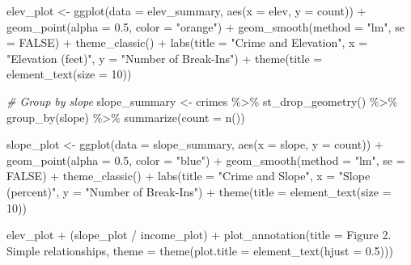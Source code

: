\documentclass[
]{article}
\newenvironment{Shaded}{\begin{snugshade}}{\end{snugshade}}
\newcommand{\AttributeTok}[1]{\textcolor[rgb]{0.77,0.63,0.00}{#1}}
\newcommand{\CommentTok}[1]{\textcolor[rgb]{0.56,0.35,0.01}{\textit{#1}}}
\newcommand{\ConstantTok}[1]{\textcolor[rgb]{0.00,0.00,0.00}{#1}}
\newcommand{\DecValTok}[1]{\textcolor[rgb]{0.00,0.00,0.81}{#1}}
\newcommand{\FloatTok}[1]{\textcolor[rgb]{0.00,0.00,0.81}{#1}}
\newcommand{\FunctionTok}[1]{\textcolor[rgb]{0.00,0.00,0.00}{#1}}
\newcommand{\NormalTok}[1]{#1}
\newcommand{\OtherTok}[1]{\textcolor[rgb]{0.56,0.35,0.01}{#1}}
\newcommand{\SpecialCharTok}[1]{\textcolor[rgb]{0.00,0.00,0.00}{#1}}
\newcommand{\StringTok}[1]{\textcolor[rgb]{0.31,0.60,0.02}{#1}}
\begin{document}
\begin{Shaded}
\begin{Highlighting}[]
\NormalTok{elev\_plot }\OtherTok{\textless{}{-}} \FunctionTok{ggplot}\NormalTok{(}\AttributeTok{data =}\NormalTok{ elev\_summary, }\FunctionTok{aes}\NormalTok{(}\AttributeTok{x =}\NormalTok{ elev, }\AttributeTok{y =}\NormalTok{ count)) }\SpecialCharTok{+}
  \FunctionTok{geom\_point}\NormalTok{(}\AttributeTok{alpha =} \FloatTok{0.5}\NormalTok{, }\AttributeTok{color =} \StringTok{"orange"}\NormalTok{) }\SpecialCharTok{+}
  \FunctionTok{geom\_smooth}\NormalTok{(}\AttributeTok{method =} \StringTok{"lm"}\NormalTok{, }\AttributeTok{se =} \ConstantTok{FALSE}\NormalTok{) }\SpecialCharTok{+}
  \FunctionTok{theme\_classic}\NormalTok{() }\SpecialCharTok{+}
  \FunctionTok{labs}\NormalTok{(}\AttributeTok{title =} \StringTok{"Crime and Elevation"}\NormalTok{,}
       \AttributeTok{x =} \StringTok{"Elevation (feet)"}\NormalTok{,}
       \AttributeTok{y =} \StringTok{"Number of Break{-}Ins"}\NormalTok{) }\SpecialCharTok{+}
  \FunctionTok{theme}\NormalTok{(}\AttributeTok{title =} \FunctionTok{element\_text}\NormalTok{(}\AttributeTok{size =} \DecValTok{10}\NormalTok{))}

\CommentTok{\# Group by slope}
\NormalTok{slope\_summary }\OtherTok{\textless{}{-}}\NormalTok{ crimes }\SpecialCharTok{\%\textgreater{}\%} 
  \FunctionTok{st\_drop\_geometry}\NormalTok{() }\SpecialCharTok{\%\textgreater{}\%} 
  \FunctionTok{group\_by}\NormalTok{(slope) }\SpecialCharTok{\%\textgreater{}\%} 
  \FunctionTok{summarize}\NormalTok{(}\AttributeTok{count =} \FunctionTok{n}\NormalTok{())}

\NormalTok{slope\_plot }\OtherTok{\textless{}{-}} \FunctionTok{ggplot}\NormalTok{(}\AttributeTok{data =}\NormalTok{ slope\_summary, }\FunctionTok{aes}\NormalTok{(}\AttributeTok{x =}\NormalTok{ slope, }\AttributeTok{y =}\NormalTok{ count)) }\SpecialCharTok{+}
  \FunctionTok{geom\_point}\NormalTok{(}\AttributeTok{alpha =} \FloatTok{0.5}\NormalTok{, }\AttributeTok{color =} \StringTok{"blue"}\NormalTok{) }\SpecialCharTok{+}
  \FunctionTok{geom\_smooth}\NormalTok{(}\AttributeTok{method =} \StringTok{"lm"}\NormalTok{, }\AttributeTok{se =} \ConstantTok{FALSE}\NormalTok{) }\SpecialCharTok{+}
  \FunctionTok{theme\_classic}\NormalTok{() }\SpecialCharTok{+}
  \FunctionTok{labs}\NormalTok{(}\AttributeTok{title =} \StringTok{"Crime and Slope"}\NormalTok{,}
       \AttributeTok{x =} \StringTok{"Slope (percent)"}\NormalTok{,}
       \AttributeTok{y =} \StringTok{"Number of Break{-}Ins"}\NormalTok{) }\SpecialCharTok{+}
  \FunctionTok{theme}\NormalTok{(}\AttributeTok{title =} \FunctionTok{element\_text}\NormalTok{(}\AttributeTok{size =} \DecValTok{10}\NormalTok{))}

\NormalTok{elev\_plot }\SpecialCharTok{+}\NormalTok{ (slope\_plot }\SpecialCharTok{/}\NormalTok{ income\_plot) }\SpecialCharTok{+} \FunctionTok{plot\_annotation}\NormalTok{(}\AttributeTok{title =} \StringTok{\textquotesingle{}Figure 2. Simple relationships\textquotesingle{}}\NormalTok{,}
                                                    \AttributeTok{theme =} \FunctionTok{theme}\NormalTok{(}\AttributeTok{plot.title =} \FunctionTok{element\_text}\NormalTok{(}\AttributeTok{hjust =} \FloatTok{0.5}\NormalTok{)))}
\end{Highlighting}
\end{Shaded}
\end{document}
